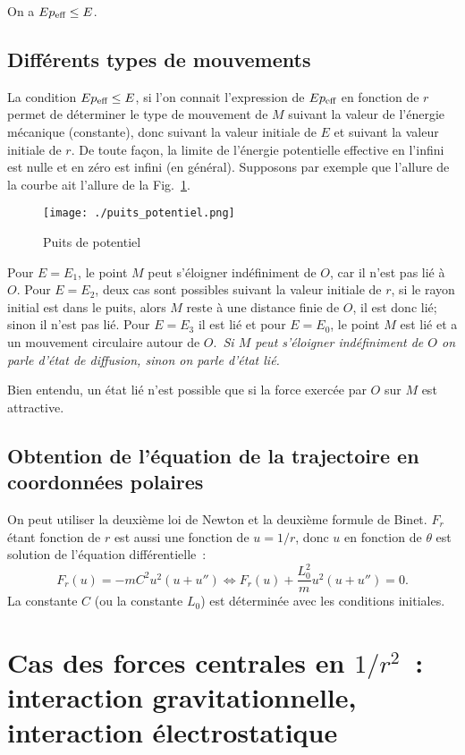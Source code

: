 On a \(Ep_{\textmd{eff}} \leq E\).

\subsection{Différents types de mouvements}%
La condition \(Ep_{\textmd{eff}} \leq E\), si l'on connait l'expression de
\(Ep_{\textmd{eff}}\) en fonction de \(r\) permet de déterminer le type de
mouvement de \(M\) suivant la valeur de l'énergie mécanique (constante), donc
suivant la valeur initiale de \(E\) et suivant la valeur initiale de \(r\). De
toute façon, la limite de l'énergie potentielle effective en l'infini est nulle
et en zéro est infini (en général). Supposons par exemple que l'allure de la
courbe ait l'allure de la Fig.~\ref{fig:puits_potentiel}.

\begin{figure}%
  \centering
  \texttt{[image: ./puits\_potentiel.png]}
  \caption{Puits de potentiel}\label{fig:puits_potentiel}
\end{figure}%

Pour \(E = E_1\), le point \(M\) peut s'éloigner indéfiniment de \(O\), car il
n'est pas lié à \(O\). Pour \(E=E_2\), deux cas sont possibles suivant la
valeur initiale de \(r\), si le rayon initial est dans le puits, alors \(M\)
reste à une distance finie de \(O\), il est donc lié; sinon il n'est pas lié.
Pour \(E=E_3\) il est lié et pour \(E=E_0\), le point \(M\) est lié et a un
mouvement circulaire autour de \(O\).\ \emph{Si \(M\) peut s'éloigner
indéfiniment de \(O\) on parle d'état de diffusion, sinon on parle d'état lié.}

Bien entendu, un état lié n'est possible que si la force exercée par \(O\) sur
\(M\) est attractive.

\subsection{Obtention de l'équation de la trajectoire en coordonnées polaires}%
On peut utiliser la deuxième loi de Newton et la deuxième formule de Binet.
\(F_r\) étant fonction de \(r\) est aussi une fonction de \(u = 1/r\), donc
\(u\) en fonction de \(\theta\) est solution de l'équation différentielle~:
\begin{equation}%
  F_r(u) = -mC^2u^2(u+u'') \iff F_r(u) + \frac{L_0^2}{m}u^2(u+u'') = 0.
\end{equation}%
La constante \(C\) (ou la constante \(L_0\)) est déterminée avec les conditions
initiales.
\section{Cas des forces centrales en \(1/r^2\)~: interaction gravitationnelle,
interaction électrostatique}
